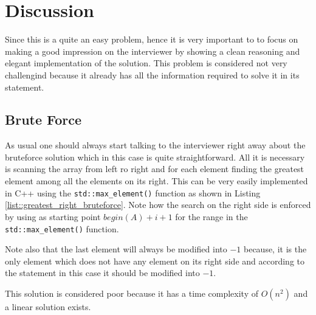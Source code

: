 \section{Discussion}
Since this is a quite an easy problem, hence it is very important to  to focus on making a good impression on the interviewer by showing a clean reasoning and elegant implementation of the solution. This problem is considered not very challengind because it already has all the information required to solve it in its statement. 

\subsection{Brute Force}
As usual one should always start talking to the interviewer right away about the bruteforce solution which in this case is quite straightforward. All it is necessary is scanning the array from left ro right and for each element finding the greatest element among all the elements on its right.
This can be very easily implemented in C++ using the \texttt{std::max\_element()} function as shown in Listing \ref{list::greatest_right_bruteforce}. Note how the search on the right side is enforced by using as starting point $begin(A)+i+1$ for the range in the \texttt{std::max\_element()} function.

	



Note also that the last element will always be modified into $-1$ because, it is the only element which does not have any element on its right side and according to the statement in this case it should be modified into $-1$.

This solution is considered poor because it has a time complexity of $O(n^2)$ and a linear solution exists. 

